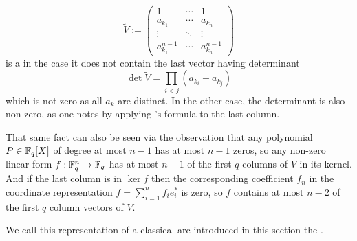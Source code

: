 $$
\tilde V :=
\begin{pmatrix}
    1             & \cdots & 1       \\
    a_{k_1}       & \cdots & a_{k_n} \\
    \vdots        & \ddots & \vdots  \\
    a_{k_1}^{n-1} & \cdots & a_{k_n}^{n-1} 
\end{pmatrix}
$$
is a  in the case it does not contain the last vector having determinant
$$
    \det{\tilde V} = \prod_{i<j}{(a_{k_i}-a_{k_j})}
$$
which is not zero as all $a_k$ are distinct. In the other case, the determinant is also non-zero, as one notes by applying 's formula to the last column.

That same fact can also be seen via the observation that any polynomial $P\in\mathbb{F}_{q}[X]$ of degree at most $n-1$ has at most $n-1$ zeros, so any non-zero linear form $f:\mathbb{F}_{q}^n\rightarrow\mathbb{F}_{q}$ has at most $n-1$ of the first $q$ columns of $V$ in its kernel.
And if the last column is in $\ker{f}$ then the corresponding coefficient $f_n$ in the coordinate representation $f=\sum_{i=1}^n{f_i e_i^{\ast}}$ is zero, so $f$ contains at most $n-2$ of the first $q$ column vectors of $V$.

We call this representation of a classical arc introduced in this section the .

